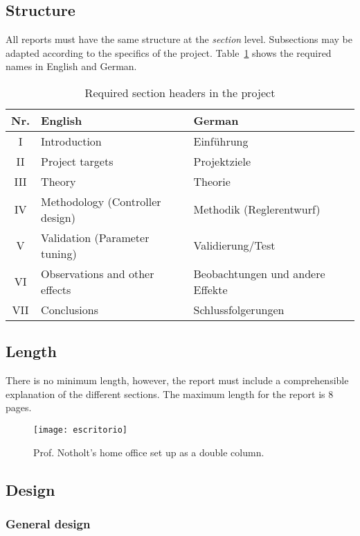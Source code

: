 	\subsection{Structure}
	
	All reports must have the same structure at the \emph{section} level. Subsections may be adapted according to the specifics of the project. Table~\ref{tbl:sections} shows the required names in English and German.
	
	\begin{table}[hb]
		\caption{Required section headers in the project}\label{tbl:sections}
		\centering
		\begin{tabular}{cp{12em}p{12em}}
			\hline
			\bfseries Nr. & \bfseries English & \bfseries German\\
			\hline
			I & Introduction & Einführung\\
			II & Project targets & Projektziele \\
			III & Theory & Theorie \\
			IV & Methodology (Controller design) & Methodik (Reglerentwurf)\\
			V & Validation (Parameter tuning) & Validierung/Test \\
			VI & Observations and other effects & Beobachtungen und andere Effekte\\
			VII & Conclusions & Schlussfolgerungen\\
			\hline
		\end{tabular}
	\end{table}
	

	\subsection{Length}
	
	There is no minimum length, however, the report must include a comprehensible explanation of the different sections. The maximum length for the report is 8 pages.
	
	\begin{figure*}[hbt]
		\texttt{[image: escritorio]}
		\caption{Prof. Notholt's home office set up as a double column.}\label{fig:doublecolumn}
	\end{figure*}
	
	\subsection{Design}
	
	\subsubsection{General design}
	
